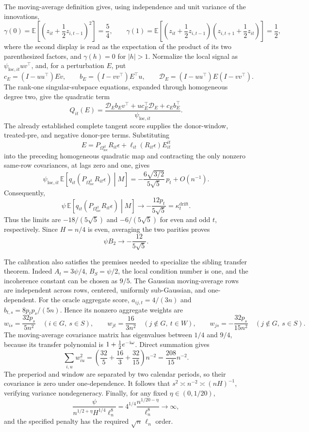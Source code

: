 The moving-average definition gives, using independence and unit variance of the innovations,
\[
\gamma(0)=\mathbb E\left[\left(z_{it}+\frac12z_{i,t-1}\right)^2\right]=\frac54,
\qquad
\gamma(1)=\mathbb E\left[\left(z_{it}+\frac12z_{i,t-1}\right)
\left(z_{i,t+1}+\frac12z_{it}\right)\right]=\frac12,
\]
where the second display is read as the expectation of the product of its two parenthesized factors, and \(\gamma(h)=0\) for \(|h|>1\).  Normalize the local signal as \(\psi_{\mathrm{loc},it}uv^\top\), and, for a perturbation \(E\), put
\[
c_E=(I-uu^\top)Ev,\qquad
b_E=(I-vv^\top)E^\top u,\qquad
\mathscr D_E=(I-uu^\top)E(I-vv^\top).
\]
The rank-one singular-subspace equations, expanded through homogeneous degree two, give the quadratic term
\[
Q_{it}(E)
=
\frac{\mathscr D_Eb_Ev^\top+u c_E^\top\mathscr D_E+c_Eb_E^\top}
{\psi_{\mathrm{loc},it}}.
\]
The already established complete tangent score supplies the donor-window, treated-pre, and negative donor-pre terms.  Substituting
\[
E=P_{\Omega_{\mathrm{loc}}^{it}}R_{it}\epsilon+
\ell_{it}(R_{it}\epsilon)E^{it}_{it}
\]
into the preceding homogeneous quadratic map and contracting the only nonzero same-row covariances, at lags zero and one, gives
\[
\psi_{\mathrm{loc},it}\,
\mathbb E\!\left[
q_{it}\!\left(P_{\Omega_{\mathrm{loc}}^{it}}R_{it}\epsilon\right)
\middle|M\right]
=-\frac{6\sqrt{3/2}}{5\sqrt5}\,p_t+O(n^{-1}).
\]
Consequently,
\[
\psi\,
\mathbb E\!\left[
q_{it}\!\left(P_{\Omega_{\mathrm{loc}}^{it}}R_{it}\epsilon\right)
\middle|M\right]
\longrightarrow-\frac{12p_t}{5\sqrt5}
=\kappa_t^{\mathrm{drift}}.
\]
Thus the limits are \(-18/(5\sqrt5)\) and \(-6/(5\sqrt5)\) for even and odd \(t\), respectively.  Since \(H=n/4\) is even, averaging the two parities proves
\[
\psi B_2\longrightarrow-\frac{12}{5\sqrt5}.
\]

The calibration also satisfies the premises needed to specialize the sibling transfer theorem.  Indeed \(A_t=3\psi/4\), \(B_S=\psi/2\), the local condition number is one, and the incoherence constant can be chosen as \(9/5\).  The Gaussian moving-average rows are independent across rows, centered, uniformly sub-Gaussian, and one-dependent.  For the oracle aggregate score, \(a_{ij,t}=4/(3n)\) and \(b_{t,s}=8p_tp_s/(5n)\).  Hence its nonzero aggregate weights are
\[
w_{is}=\frac{32p_s}{5n^2}\quad(i\in G,\ s\in S),
\qquad
w_{jt}=\frac{16}{3n^2}\quad(j\notin G,\ t\in W),
\qquad
w_{js}=-\frac{32p_s}{15n^2}\quad(j\notin G,\ s\in S).
\]
The moving-average covariance matrix has eigenvalues between \(1/4\) and \(9/4\), because its transfer polynomial is \(1+\tfrac12e^{-{\rm i}\omega}\).  Direct summation gives
\[
\sum_{i,u}w_{iu}^2
=
\left(\frac{32}{5}+\frac{16}{3}+\frac{32}{15}\right)n^{-2}
=\frac{208}{15}n^{-2}.
\]
The preperiod and window are separated by two calendar periods, so their covariance is zero under one-dependence.  It follows that \(s^2\asymp n^{-2}\asymp(nH)^{-1}\), verifying variance nondegeneracy.  Finally, for any fixed \(\eta\in(0,1/20)\),
\[
\frac{\psi}{n^{1/2+\eta}H^{1/4}\ell_n^8}
=4^{1/4}\frac{n^{1/20-\eta}}{\ell_n^8}
\longrightarrow\infty,
\]
and the specified penalty has the required \(\sqrt n\,\ell_n\) order.

